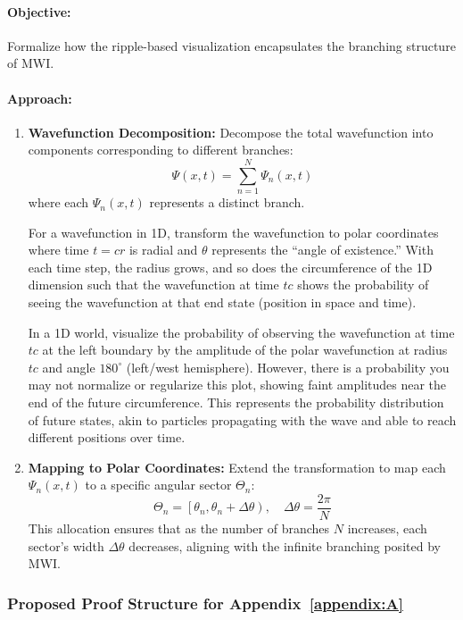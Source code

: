 \documentclass[12pt]{article}
\begin{document}
\paragraph{Objective:} Formalize how the ripple-based visualization encapsulates the branching structure of MWI.

\paragraph{Approach:}
\begin{enumerate}
    \item \textbf{Wavefunction Decomposition:}
    Decompose the total wavefunction into components corresponding to different branches:
    \[
    \Psi(x,t) = \sum_{n=1}^{N} \Psi_n(x,t)
    \]
    where each \(\Psi_n(x,t)\) represents a distinct branch.
    
    For a wavefunction in 1D, transform the wavefunction to polar coordinates where time \(t = cr\) is radial and \(\theta\) represents the “angle of existence.” With each time step, the radius grows, and so does the circumference of the 1D dimension such that the wavefunction at time \(tc\) shows the probability of seeing the wavefunction at that end state (position in space and time).
    
    In a 1D world, visualize the probability of observing the wavefunction at time \(tc\) at the left boundary by the amplitude of the polar wavefunction at radius \(tc\) and angle \(180^\circ\) (left/west hemisphere). However, there is a probability you may not normalize or regularize this plot, showing faint amplitudes near the end of the future circumference. This represents the probability distribution of future states, akin to particles propagating with the wave and able to reach different positions over time.
    
    \item \textbf{Mapping to Polar Coordinates:}
    Extend the transformation to map each \(\Psi_n(x,t)\) to a specific angular sector \(\Theta_n\):
    \[
    \Theta_n = \left[\theta_n, \theta_n + \Delta\theta\right), \quad \Delta\theta = \frac{2\pi}{N}
    \]
    This allocation ensures that as the number of branches \(N\) increases, each sector's width \(\Delta\theta\) decreases, aligning with the infinite branching posited by MWI.
\end{enumerate}

\subsubsection{Proposed Proof Structure for Appendix~\ref{appendix:A}}
\end{document}
